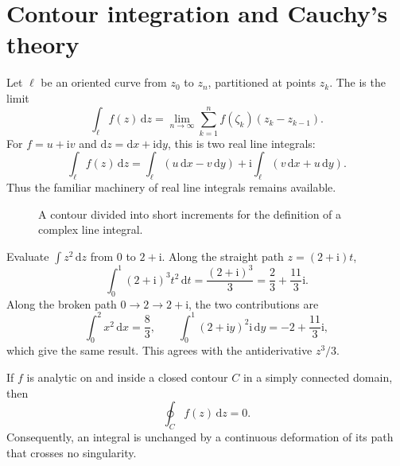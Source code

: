 \section{Contour integration and Cauchy's theory}

Let $\ell$ be an oriented curve from $z_0$ to $z_n$, partitioned at points $z_k$. The  is the limit
\begin{equation}
\int_\ell f(z)\,\mathrm{d}z=\lim_{n\to\infty}\sum_{k=1}^n f(\zeta_k)(z_k-z_{k-1}).
\end{equation}
For $f=u+\mathrm{i}v$ and $\mathrm{d}z=\mathrm{d}x+\mathrm{i}\mathrm{d}y$, this is two real line integrals:
\begin{equation}
\int_\ell f(z)\,\mathrm{d}z=\int_\ell(u\,\mathrm{d}x-v\,\mathrm{d}y)+\mathrm{i}\int_\ell(v\,\mathrm{d}x+u\,\mathrm{d}y).
\end{equation}
Thus the familiar machinery of real line integrals remains available.

\begin{figure}[htb]
    \centering
    \caption{A contour divided into short increments for the definition of a complex line integral.}
    \label{fig:ch06-contour-integral}
\end{figure}

\begin{example}
Evaluate $\int z^2\,\mathrm{d}z$ from $0$ to $2+\mathrm{i}$. Along the straight path $z=(2+\mathrm{i})t$,
\begin{equation}
\int_0^1(2+\mathrm{i})^3t^2\,\mathrm{d}t=\frac{(2+\mathrm{i})^3}{3}
=\frac23+\frac{11}{3}\mathrm{i}.
\end{equation}
Along the broken path $0\to2\to2+\mathrm{i}$, the two contributions are
\begin{equation}
\int_0^2x^2\,\mathrm{d}x=\frac83,
\qquad
\int_0^1(2+\mathrm{i}y)^2\mathrm{i}\,\mathrm{d}y=-2+\frac{11}{3}\mathrm{i},
\end{equation}
which give the same result. This agrees with the antiderivative $z^3/3$.
\end{example}

\begin{theorem}
If $f$ is analytic on and inside a closed contour $C$ in a simply connected domain, then
\begin{equation}
\oint_C f(z)\,\mathrm{d}z=0.
\end{equation}
Consequently, an integral is unchanged by a continuous deformation of its path that crosses no singularity.
\end{theorem}

